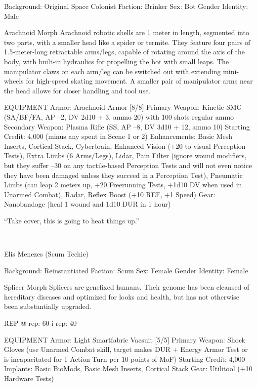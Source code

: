 Background: Original Space Colonist
Faction: Brinker
Sex: Bot
Gender Identity: Male

Arachnoid Morph
Arachnoid robotic shells are 1 meter in length, segmented into two parts, with a smaller head like a spider or termite. They feature four pairs of 1.5-meter-long retractable arms/legs, capable of rotating around the axis of the body, with built-in hydraulics for propelling the bot with small leaps. The manipulator claws on each arm/leg can be switched out with extending mini-wheels for high-speed skating movement. A smaller pair of manipulator arms near the head allows for closer handling and tool use.

EQUIPMENT
Armor: Arachnoid Armor [8/8]
Primary Weapon: Kinetic SMG (SA/BF/FA, AP –2, DV 2d10 + 3, ammo 20) with 100 shots regular ammo
Secondary Weapon: Plasma Rifle (SS, AP –8, DV 3d10 + 12, ammo 10)
Starting Credit: 4,000 (minus any spent in Scene 1 or 2)
Enhancements: Basic Mesh Inserts, Cortical Stack, Cyberbrain, Enhanced Vision (+20 to visual Perception Tests), Extra Limbs (6 Arms/Legs), Lidar, Pain Filter (ignore wound modifiers, but they suffer –30 on any tactile-based Perception Tests and will not even notice they have been damaged unless they succeed in a Perception Test), Pneumatic Limbs (can leap 2 meters up, +20 Freerunning Tests, +1d10 DV when used in Unarmed Combat), Radar, Reflex Boost (+10 REF, +1 Speed)
Gear: Nanobandage (heal 1 wound and 1d10 DUR in 1 hour)

“Take cover, this is going to heat things up.”

---

Elis Menezes (Scum Techie)

Background: Reinstantiated
Faction: Scum
Sex: Female
Gender Identity: Female

Splicer Morph
Splicers are genefixed humans. Their genome has been cleansed of hereditary diseases and optimized for looks and health, but has not otherwise been substantially upgraded.

REP
@-rep:	60
i-rep:	40

EQUIPMENT
Armor: Light Smartfabric Vacsuit [5/5]
Primary Weapon: Shock Gloves (use Unarmed Combat skill, target makes DUR + Energy Armor Test or is incapacitated for 1 Action Turn per 10 points of MoF)
Starting Credit: 4,000
Implants: Basic BioMods, Basic Mesh Inserts, Cortical Stack
Gear: Utilitool (+10 Hardware Tests)

